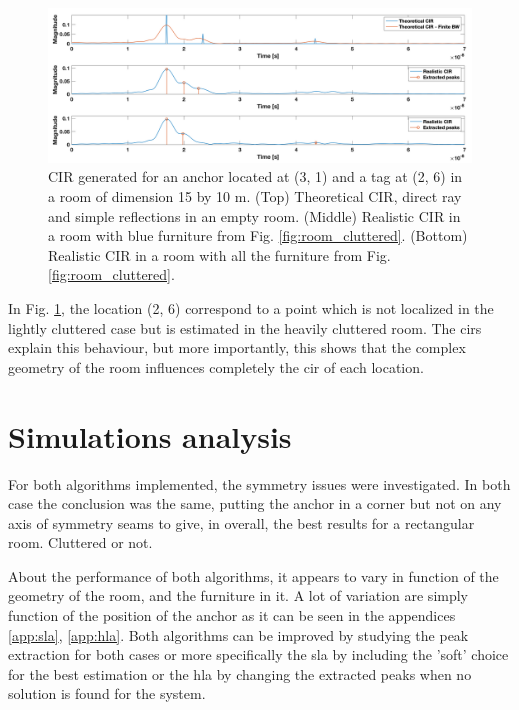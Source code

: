 \begin{figure}[H]
\centering
\includegraphics[width=.9\linewidth]{Images/image_1.png}
\caption{CIR generated for an anchor located at (3, 1) and a tag at (2, 6) in a room of dimension 15 by 10 m. (Top) Theoretical CIR, direct ray and simple reflections in an empty room. (Middle) Realistic CIR in a room with blue furniture from Fig. \ref{fig:room_cluttered}. (Bottom) Realistic CIR in a room with all the furniture from Fig. \ref{fig:room_cluttered}. \label{fig:cir_hla_1}}
\end{figure}

In Fig. \ref{fig:cir_hla_1}, the location (2, 6) correspond to a point which is not localized in the lightly cluttered case but is estimated in the heavily cluttered room. The \glspl{cir} explain this behaviour, but more importantly, this shows that the complex geometry of the room influences completely the \gls{cir} of each location.



\section{Simulations analysis}
\label{simu_anal}

For both algorithms implemented, the symmetry issues were investigated. In both case the conclusion was the same, putting the anchor in a corner but not on any axis of symmetry seams to give, in overall, the best results for a rectangular room. Cluttered or not.
\vspace{2mm}

About the performance of both algorithms, it appears to vary in function of the geometry of the room, and the furniture in it. A lot of variation are simply function of the position of the anchor as it can be seen in the appendices \ref{app:sla}, \ref{app:hla}. Both algorithms can be improved by studying the peak extraction for both cases or more specifically the \gls{sla} by including the 'soft' choice for the best estimation or the \gls{hla} by changing the extracted peaks when no solution is found for the system.


